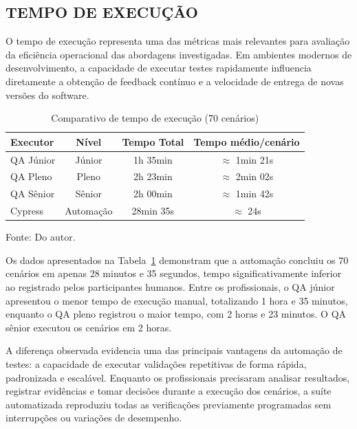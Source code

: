\documentclass{UNESC}
\begin{document}
\subsection{TEMPO DE EXECUÇÃO}

O tempo de execução representa uma das métricas mais relevantes para avaliação da eficiência operacional das abordagens investigadas. Em ambientes modernos de desenvolvimento, a capacidade de executar testes rapidamente influencia diretamente a obtenção de feedback contínuo e a velocidade de entrega de novas versões do software.

\begin{table}[H]
\captionsetup{skip=2pt, singlelinecheck=false, justification=centering}
\caption{Comparativo de tempo de execução (70 cenários)}
\label{tab:tempo}
\renewcommand{\arraystretch}{1.0}
\setlength{\extrarowheight}{4pt}
\setlength{\tabcolsep}{6pt}
\begin{tabularx}{\textwidth}{X c c c}
\hline
\textbf{Executor} & \textbf{Nível} & \textbf{Tempo Total} & \textbf{Tempo médio/cenário} \\
\hline
QA Júnior & Júnior & 1h 35min & $\approx$ 1min 21s \\
QA Pleno  & Pleno  & 2h 23min & $\approx$ 2min 02s \\
QA Sênior & Sênior & 2h 00min & $\approx$ 1min 42s \\
Cypress   & Automação & 28min 35s & $\approx$ 24s \\
\hline
\end{tabularx}
\vspace{2mm}\par
\noindent Fonte: Do autor.
\end{table}

Os dados apresentados na Tabela~\ref{tab:tempo} demonstram que a automação concluiu os 70 cenários em apenas 28 minutos e 35 segundos, tempo significativamente inferior ao registrado pelos participantes humanos. Entre os profissionais, o QA júnior apresentou o menor tempo de execução manual, totalizando 1 hora e 35 minutos, enquanto o QA pleno registrou o maior tempo, com 2 horas e 23 minutos. O QA sênior executou os cenários em 2 horas.

A diferença observada evidencia uma das principais vantagens da automação de testes: a capacidade de executar validações repetitivas de forma rápida, padronizada e escalável. Enquanto os profissionais precisaram analisar resultados, registrar evidências e tomar decisões durante a execução dos cenários, a suíte automatizada reproduziu todas as verificações previamente programadas sem interrupções ou variações de desempenho.
\end{document}
